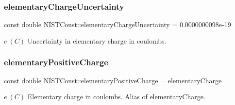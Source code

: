 \subsubsection{\texorpdfstring{elementary\+Charge\+Uncertainty}{elementaryChargeUncertainty}}
{\footnotesize\ttfamily const double N\+I\+S\+T\+Const\+::elementary\+Charge\+Uncertainty = 0.\+0000000098e-\/19}

$e \ (C)$ Uncertainty in elementary charge in coulombs. \mbox{\label{group___elementary_charge_ga1177663318bfe8bfa4b0c4fa489fbfb2}} 
\subsubsection{\texorpdfstring{elementary\+Positive\+Charge}{elementaryPositiveCharge}}
{\footnotesize\ttfamily const double N\+I\+S\+T\+Const\+::elementary\+Positive\+Charge = elementary\+Charge}

$e \ (C)$ Elementary charge in coulombs. Alias of elementary\+Charge. 